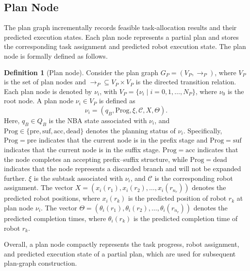 \documentclass[lettersize,journal]{IEEEtran}
\theoremstyle{italiclemma}
\theoremstyle{italiclemma}
\theoremstyle{definition}
\newtheorem{definition}{Definition}
\begin{document}
\subsection{Plan Node}
The plan graph incrementally records feasible task-allocation results and their predicted execution states. Each plan node represents a partial plan and stores the corresponding task assignment and predicted robot execution state. The plan node is formally defined as follows.

\begin{definition}[Plan node]\label{def:plan_node}
Consider the plan graph $G_P=(V_P,\rightarrow_P)$, where $V_P$ is the set of plan nodes and $\rightarrow_P\subseteq V_P\times V_P$ is the directed transition relation.
Each plan node is denoted by $\nu_i$, with $V_P=\{\nu_i\mid i=0,1,\ldots,N_P\}$, where $\nu_0$ is the root node. A plan node $\nu_i\in V_P$ is defined as
\[
\nu_i =
(q_B,\mathrm{Prog},\xi,\mathcal{C},X,\Theta).
\]
Here, \(q_B\in Q_B\) is the NBA state associated with \(\nu_i\), and \(\mathrm{Prog}\in\{\mathrm{pre},\mathrm{suf},\mathrm{acc},\mathrm{dead}\}\) denotes the planning status of \(\nu_i\). Specifically, \(\mathrm{Prog}=\mathrm{pre}\) indicates that the current node is in the prefix stage and  \(\mathrm{Prog}=\mathrm{suf}\) indicates that the current node is in the suffix stage.  \(\mathrm{Prog}=\mathrm{acc}\) indicates that the node completes an accepting prefix--suffix structure, while \(\mathrm{Prog}=\mathrm{dead}\) indicates that the node represents a discarded branch and will not be expanded further. 
\(\xi\) is the subtask associated with \(\nu_i\), and \(\mathcal{C}\) is the corresponding robot assignment.
The vector $X=(x_i(r_1),x_i(r_2),\ldots,x_i(r_{n_r}))$ denotes the predicted robot positions, where \(x_i(r_k)\) is the predicted position of robot \(r_k\) at plan node \(\nu_i\). The vector
$\Theta=(\theta_i(r_1),\theta_i(r_2),\ldots,\theta_i(r_{n_r}))$
denotes the predicted completion times, where \(\theta_i(r_k)\) is the predicted completion time of robot \(r_k\).
\end{definition}

Overall, a plan node compactly represents the task progress, robot assignment, and predicted execution state of a partial plan, which are used for subsequent plan-graph construction.
\end{document}
